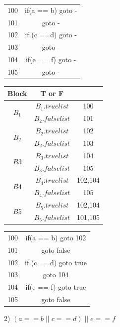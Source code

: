 \documentclass[a4paper, 16pt]{article}
\begin{document}
\begin{table}[H]
\centering
\begin{tabular}{c c}
100 & if(a == b) goto -\\
101 & goto -\\
102 &if (c ==d) goto -\\
103 &goto -\\
104 & if(e == f) goto -\\
105 & goto -\\
\end{tabular}
\end{table}

\begin{table}[H]
\centering
\begin{tabular}{c|c|c}
\hline
\hline
Block & T or F & \\
\hline
\multirow{2}{*}{$B_1$} 
&$B_1.truelist$ & 100\\
&$B_2.falselist$ &101\\
\hline
\multirow{2}{*}{$B_2$} 
&$B_2.truelist$&102\\
&$B_2.falselist$ &103\\
\hline
\multirow{2}{*}{$B3$} 
&$B_3.truelist$ &104\\
&$B_3.falselist$&105\\
\hline
\multirow{2}{*}{$B4$} 
&$B_4.truelist$&102,104\\
&$B_4.falselist$&105\\
\hline
\multirow{2}{*}{$B5$} 
&$B_5.truelist$&102,104\\
&$B_5.falselist$&101,105\\
\hline
\end{tabular}
\end{table}

\begin{table}[H]
\centering
\begin{tabular}{c c}
100 & if(a == b) goto 102\\
101 & goto false\\
102 &if (c ==d) goto true\\
103 &goto 104\\
104 & if(e == f) goto true\\
105 & goto false\\
\end{tabular}
\end{table}

2) $(a == b \;||\; c == d)\; ||\; e == f$
\end{document}
